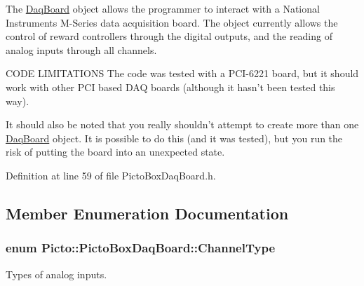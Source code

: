 The \hyperlink{class_daq_board}{Daq\-Board} object allows the programmer to interact with a National Instruments M-\/\-Series data acquisition board. The object currently allows the control of reward controllers through the digital outputs, and the reading of analog inputs through all channels.

C\-O\-D\-E L\-I\-M\-I\-T\-A\-T\-I\-O\-N\-S The code was tested with a P\-C\-I-\/6221 board, but it should work with other P\-C\-I based D\-A\-Q boards (although it hasn't been tested this way).

It should also be noted that you really shouldn't attempt to create more than one \hyperlink{class_daq_board}{Daq\-Board} object. It is possible to do this (and it was tested), but you run the risk of putting the board into an unexpected state. 

Definition at line 59 of file Picto\-Box\-Daq\-Board.\-h.



\subsection{Member Enumeration Documentation}
\hypertarget{class_picto_1_1_picto_box_daq_board_a360f27f60651ecf404df481d9e214839}{
\subsubsection[{Channel\-Type}]{\setlength{\rightskip}{0pt plus 5cm}enum {\bf Picto\-::\-Picto\-Box\-Daq\-Board\-::\-Channel\-Type}}}\label{class_picto_1_1_picto_box_daq_board_a360f27f60651ecf404df481d9e214839}


Types of analog inputs. 

